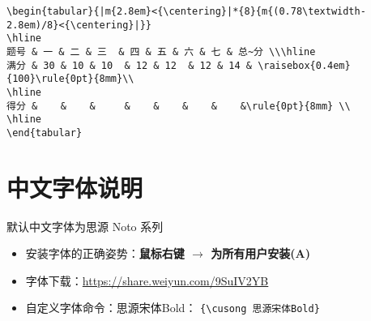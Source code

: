 \documentclass[11pt,twoside]{article}
\begin{document}
\begin{lstlisting}[style=tsdtex]
\begin{tabular}{|m{2.8em}<{\centering}|*{8}{m{(0.78\textwidth-2.8em)/8}<{\centering}|}}
\hline
题号 & 一 & 二 & 三  & 四 & 五 & 六 & 七 & 总~分 \\\hline
满分 & 30 & 10 & 10  & 12 & 12  & 12 & 14 & \raisebox{0.4em}{100}\rule{0pt}{8mm}\\
\hline
得分 &    &    &     &    &    &    &    &\rule{0pt}{8mm} \\
\hline		
\end{tabular}
\end{lstlisting}

\section{中文字体说明}

默认中文字体为思源 Noto 系列
\begin{itemize}
\item 安装字体的正确姿势：\textbf{鼠标右键 $\rightarrow$ 为所有用户安装(A)}
\item 字体下载：\url{https://share.weiyun.com/9SuIV2YB}
\item 自定义字体命令：{\cusong 思源宋体Bold}： \lstinline[style=iltx]|{\cusong 思源宋体Bold}|
\end{itemize}


\end{document}
